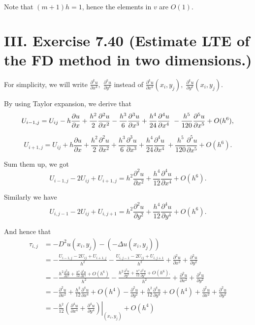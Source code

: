 \documentclass[twoside,a4paper]{article}
\begin{document}
Note that $(m+1)h=1$, hence the elements in $v$ are $O(1)$.

\section*{III. Exercise 7.40 (Estimate LTE of the FD method in two dimensions.)}

\;\;\;\; For simplicity, we will write $\frac{\partial^k u}{\partial x^k},\;\frac{\partial^k u}{\partial y^k}$ instead of $\frac{\partial^k u}{\partial x^k}(x_i,y_j),\;\frac{\partial^k u}{\partial y^k}(x_i,y_j)$.

By using Taylor expansion, we derive that
\begin{equation*}
	U_{i-1,j} = U_{ij} - h\frac{\partial u}{\partial x} + \frac{h^2}{2}\frac{\partial^2 u}{\partial x^2}
	-\frac{h^3}{6}\frac{\partial^3 u}{\partial x^3} + \frac{h^4}{24}\frac{\partial^4 u}{\partial x^4}\
	-\frac{h^5}{120}\frac{\partial^5 u}{\partial x^5} + O(h^6),\\
\end{equation*}

\begin{equation*}
	U_{i+1,j} = U_{ij} + h\frac{\partial u}{\partial x} + \frac{h^2}{2}\frac{\partial^2 u}{\partial x^2}
	+\frac{h^3}{6}\frac{\partial^3 u}{\partial x^3} + \frac{h^4}{24}\frac{\partial^4 u}{\partial x^4}\
	+\frac{h^5}{120}\frac{\partial^5 u}{\partial x^5} + O(h^6).
\end{equation*}

Sum them up, we got
\begin{equation*}
	U_{i-1,j}-2U_{ij}+U_{i+1,j} = h^2\frac{\partial^2 u}{\partial x^2} + \frac{h^4}{12}\frac{\partial^4 u}{\partial x^4} + O(h^6).
\end{equation*}

Similarly we have
\begin{equation*}
	U_{i,j-1}-2U_{ij}+U_{i,j+1} = h^2\frac{\partial^2 u}{\partial y^2} + \frac{h^4}{12}\frac{\partial^4 u}{\partial y^4} + O(h^6).
\end{equation*}

And hence that
\begin{align*}
	\tau_{i,j} &= -D^2u(x_i,y_j) - (-\Delta u(x_i,y_j)) \\
	&= -\frac{U_{i-1,j}-2U_{ij}+U_{i+1,j}}{h^2}-\frac{U_{i,j-1}-2U_{ij}+U_{i,j+1}}{h^2}+\frac{\partial^2 u}{\partial x^2}+\frac{\partial^2 u}{\partial y^2}\\
	&= -\frac{h^2\frac{\partial^2 u}{\partial x^2} + \frac{h^4}{12}\frac{\partial^4 u}{\partial x^4} + O(h^6)}{h^2} - \frac{h^2\frac{\partial^2 u}{\partial y^2} + \frac{h^4}{12}\frac{\partial^4 u}{\partial y^4} + O(h^6).}{h^2} + \frac{\partial^2 u}{\partial x^2}+\frac{\partial^2 u}{\partial y^2}\\
	&= -\frac{\partial^2 u}{\partial x^2}+\frac{h^2}{12}\frac{\partial^4 u}{\partial x^4}+O(h^4)-\frac{\partial^2 u}{\partial y^2}+\frac{h^2}{12}\frac{\partial^4 u}{\partial y^4}+O(h^4)+ \frac{\partial^2 u}{\partial x^2}+\frac{\partial^2 u}{\partial y^2}\\
	&= -\frac{h^2}{12}\left.\left(\frac{\partial^4 u}{\partial x^4}+\frac{\partial^4 u}{\partial y^4}\right)\right|_{(x_i,y_j)}+O(h^4)
\end{align*}
\end{document}
